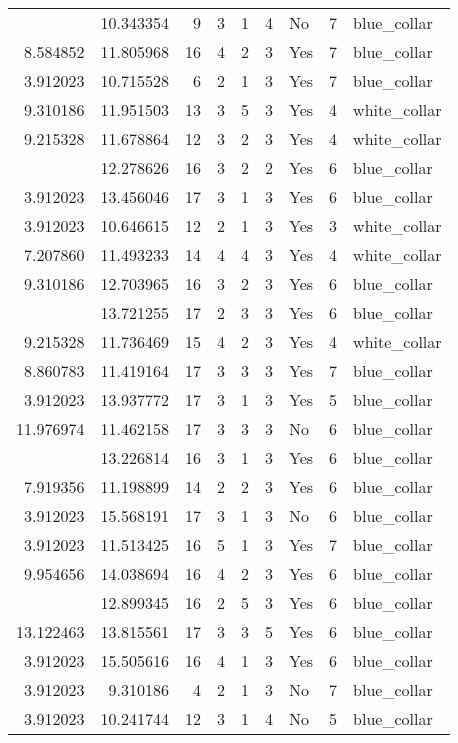 \documentclass[
]{article}
\begin{document}
\begin{longtable}[t]{rrrrrllrl}
\addlinespace
3.912023 & 10.343354 & 9 & 3 & 1 & 4 & No & 7 & blue\_collar\\
8.584852 & 11.805968 & 16 & 4 & 2 & 3 & Yes & 7 & blue\_collar\\
3.912023 & 10.715528 & 6 & 2 & 1 & 3 & Yes & 7 & blue\_collar\\
9.310186 & 11.951503 & 13 & 3 & 5 & 3 & Yes & 4 & white\_collar\\
9.215328 & 11.678864 & 12 & 3 & 2 & 3 & Yes & 4 & white\_collar\\
\addlinespace
8.993427 & 12.278626 & 16 & 3 & 2 & 2 & Yes & 6 & blue\_collar\\
3.912023 & 13.456046 & 17 & 3 & 1 & 3 & Yes & 6 & blue\_collar\\
3.912023 & 10.646615 & 12 & 2 & 1 & 3 & Yes & 3 & white\_collar\\
7.207860 & 11.493233 & 14 & 4 & 4 & 3 & Yes & 4 & white\_collar\\
9.310186 & 12.703965 & 16 & 3 & 2 & 3 & Yes & 6 & blue\_collar\\
\addlinespace
13.201267 & 13.721255 & 17 & 2 & 3 & 3 & Yes & 6 & blue\_collar\\
9.215328 & 11.736469 & 15 & 4 & 2 & 3 & Yes & 4 & white\_collar\\
8.860783 & 11.419164 & 17 & 3 & 3 & 3 & Yes & 7 & blue\_collar\\
3.912023 & 13.937772 & 17 & 3 & 1 & 3 & Yes & 5 & blue\_collar\\
11.976974 & 11.462158 & 17 & 3 & 3 & 3 & No & 6 & blue\_collar\\
\addlinespace
3.912023 & 13.226814 & 16 & 3 & 1 & 3 & Yes & 6 & blue\_collar\\
7.919356 & 11.198899 & 14 & 2 & 2 & 3 & Yes & 6 & blue\_collar\\
3.912023 & 15.568191 & 17 & 3 & 1 & 3 & No & 6 & blue\_collar\\
3.912023 & 11.513425 & 16 & 5 & 1 & 3 & Yes & 7 & blue\_collar\\
9.954656 & 14.038694 & 16 & 4 & 2 & 3 & Yes & 6 & blue\_collar\\
\addlinespace
10.758966 & 12.899345 & 16 & 2 & 5 & 3 & Yes & 6 & blue\_collar\\
13.122463 & 13.815561 & 17 & 3 & 3 & 5 & Yes & 6 & blue\_collar\\
3.912023 & 15.505616 & 16 & 4 & 1 & 3 & Yes & 6 & blue\_collar\\
3.912023 & 9.310186 & 4 & 2 & 1 & 3 & No & 7 & blue\_collar\\
3.912023 & 10.241744 & 12 & 3 & 1 & 4 & No & 5 & blue\_collar\\

\end{longtable}
\end{document}
